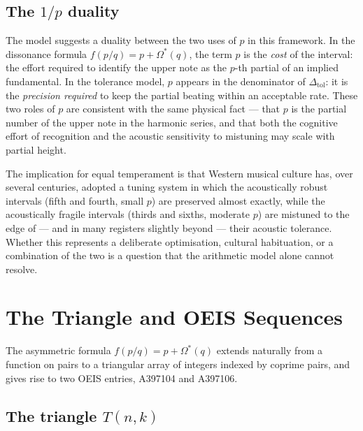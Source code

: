 \documentclass[11pt,a4paper]{article}
\newcommand{\Os}{\Omega^{\!*}}
\begin{document}
\subsection*{The $1/p$ duality}

The model suggests a duality between the two uses of $p$ in this framework.
In the dissonance formula $f(p/q) = p + \Os(q)$, the term $p$ is the
\emph{cost} of the interval: the effort required to identify the upper note
as the $p$-th partial of an implied fundamental. In the tolerance model, $p$
appears in the denominator of $\Delta_{\mathrm{tol}}$: it is the
\emph{precision required} to keep the partial beating within an acceptable
rate. These two roles of $p$ are consistent with the same physical fact ---
that $p$ is the partial number of the upper note in the harmonic series, and
that both the cognitive effort of recognition and the acoustic sensitivity
to mistuning may scale with partial height.

The implication for equal temperament is that Western musical culture has, over
several centuries, adopted a tuning system in which the acoustically robust
intervals (fifth and fourth, small $p$) are preserved almost exactly, while
the acoustically fragile intervals (thirds and sixths, moderate $p$) are
mistuned to the edge of --- and in many registers slightly beyond --- their
acoustic tolerance. Whether this represents a deliberate optimisation,
cultural habituation, or a combination of the two is a question that the
arithmetic model alone cannot resolve.


\section{The Triangle and OEIS Sequences}

The asymmetric formula $f(p/q) = p + \Os(q)$ extends naturally from a
function on pairs to a triangular array of integers indexed by coprime pairs,
and gives rise to two OEIS entries, A397104 and A397106.

\subsection*{The triangle \texorpdfstring{$T(n,k)$}{T(n,k)}}
\end{document}
